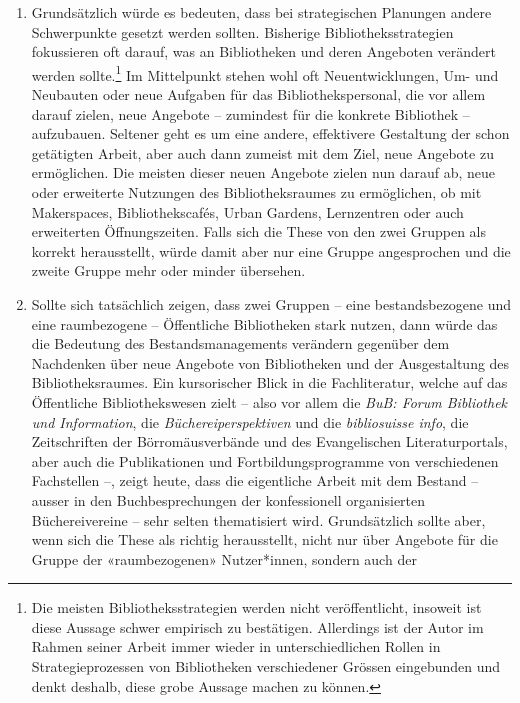 \documentclass[a4paper,
fontsize=11pt,
oneside,
numbers=noperiodatend,
parskip=half-,
bibliography=totoc,
final
]{scrartcl}
\begin{document}
\begin{enumerate}
\def\labelenumi{\arabic{enumi}.}
\item
  Grundsätzlich würde es bedeuten, dass bei strategischen Planungen
  andere Schwerpunkte gesetzt werden sollten. Bisherige
  Bibliotheksstrategien fokussieren oft darauf, was an Bibliotheken und
  deren Angeboten verändert werden sollte.\footnote{Die meisten
    Bibliotheksstrategien werden nicht veröffentlicht, insoweit ist
    diese Aussage schwer empirisch zu bestätigen. Allerdings ist der
    Autor im Rahmen seiner Arbeit immer wieder in unterschiedlichen
    Rollen in Strategieprozessen von Bibliotheken verschiedener Grössen
    eingebunden und denkt deshalb, diese grobe Aussage machen zu können.}
  Im Mittelpunkt stehen wohl oft Neuentwicklungen, Um- und Neubauten
  oder neue Aufgaben für das Bibliothekspersonal, die vor allem darauf
  zielen, neue Angebote -- zumindest für die konkrete Bibliothek --
  aufzubauen. Seltener geht es um eine andere, effektivere Gestaltung
  der schon getätigten Arbeit, aber auch dann zumeist mit dem Ziel, neue
  Angebote zu ermöglichen. Die meisten dieser neuen Angebote zielen nun
  darauf ab, neue oder erweiterte Nutzungen des Bibliotheksraumes zu
  ermöglichen, ob mit Makerspaces, Bibliothekscafés, Urban Gardens,
  Lernzentren oder auch erweiterten Öffnungszeiten. Falls sich die These
  von den zwei Gruppen als korrekt herausstellt, würde damit aber nur
  eine Gruppe angesprochen und die zweite Gruppe mehr oder minder
  übersehen.
\item
  Sollte sich tatsächlich zeigen, dass zwei Gruppen -- eine
  bestandsbezogene und eine raumbezogene -- Öffentliche Bibliotheken
  stark nutzen, dann würde das die Bedeutung des Bestandsmanagements
  verändern gegenüber dem Nachdenken über neue Angebote von Bibliotheken
  und der Ausgestaltung des Bibliotheksraumes. Ein kursorischer Blick in
  die Fachliteratur, welche auf das Öffentliche Bibliothekswesen zielt
  -- also vor allem die \emph{BuB: Forum Bibliothek und Information},
  die \emph{Büchereiperspektiven} und die \emph{bibliosuisse info}, die
  Zeitschriften der Börromäusverbände und des Evangelischen
  Literaturportals, aber auch die Publikationen und
  Fortbildungsprogramme von verschiedenen Fachstellen --, zeigt heute,
  dass die eigentliche Arbeit mit dem Bestand -- ausser in den
  Buchbesprechungen der konfessionell organisierten Büchereivereine --
  sehr selten thematisiert wird. Grundsätzlich sollte aber, wenn sich
  die These als richtig herausstellt, nicht nur über Angebote für die
  Gruppe der «raumbezogenen» Nutzer*innen, sondern auch der

\end{enumerate}
\end{document}
